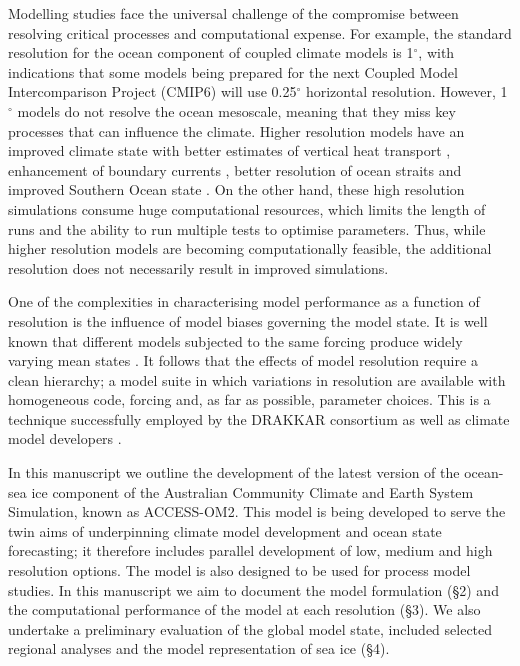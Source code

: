 \documentclass[gmd, manuscript]{copernicus}
\begin{document}
Modelling studies face the universal challenge of the compromise between resolving critical processes and computational expense.
For example, the standard resolution for the ocean component of coupled climate models is 1$^\circ$, with indications that some models being prepared for the next Coupled Model Intercomparison Project (CMIP6) will use 0.25$^\circ$ horizontal resolution.
However, 1$^\circ$ models do not resolve the ocean mesoscale, meaning that they miss key processes that can influence the climate. 
Higher resolution models have an improved climate state with better estimates of vertical heat transport \citep{Griffies2015}, enhancement of boundary currents \citep{Hewitt2016}, better resolution of ocean straits and improved Southern Ocean state \citep{Bishop2016}.
On the other hand, these high resolution simulations consume huge computational resources, which limits the length of runs and the ability to run multiple tests to optimise parameters.
Thus, while higher resolution models are becoming computationally feasible, the additional resolution does not necessarily result in improved simulations.

One of the complexities in characterising model performance as a function of resolution is the influence of model biases governing the model state.
It is well known that different models subjected to the same forcing produce widely varying mean states \citep[e.g.][]{Danabasoglu:2014}.
It follows that the effects of model resolution require a clean hierarchy; a model suite in which variations in resolution are available with homogeneous code, forcing and, as far as possible, parameter choices.
This is a technique successfully employed by the DRAKKAR consortium \citep{Barnier2014} as well as climate model developers \citep[e.g.][]{Hewitt2016}.

In this manuscript we outline the development of the latest version of the ocean-sea ice component of the Australian Community Climate and Earth System Simulation, known as ACCESS-OM2.
This model is being developed to serve the twin aims of underpinning climate model development and ocean state forecasting; it therefore includes parallel development of low, medium and high resolution options.
The model is also designed to be used for process model studies. 
In this manuscript we aim to document the model formulation (\S 2) and the computational performance of the model at each resolution (\S3).
We also undertake a preliminary evaluation of the global model state, included selected regional analyses and the model representation of sea ice (\S4).
\end{document}
